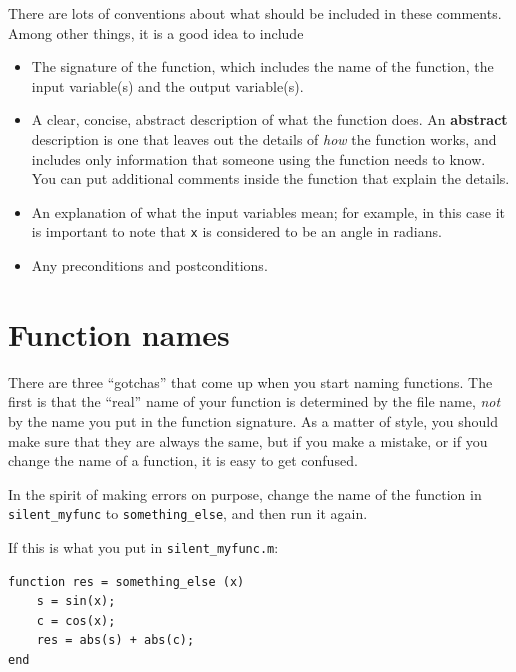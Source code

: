\documentclass[
]{book}
\begin{document}
There are lots of conventions about what should be included
in these comments.  Among other things, it is a good idea to
include

\begin{itemize}

\item The signature of the function, which includes the name
of the function, the input variable(s) and the output variable(s).

\item A clear, concise, abstract description of what the function does.
An {\bf abstract} description is one that leaves out the
details of {\em how} the function works, and includes only information
that someone using the function needs to know.  You can put additional
comments inside the function that explain the details.

\item An explanation of what the input variables mean; for example,
in this case it is important to note that {\tt x} is considered
to be an angle in radians.

\item Any preconditions and postconditions.

\end{itemize}



\section{Function names}

There are three ``gotchas'' that come up when you start naming
functions.  The first is that the ``real'' name of your function
is determined by the file name, {\em not} by the name
you put in the function signature.  As a matter of style, you
should make sure that they are always the same, but if you
make a mistake, or if you change the name of a function, it is
easy to get confused.

In the spirit of making errors on purpose, change the name of
the function in {\tt silent\_myfunc} to {\tt something\_else}, and
then run it again.

If this is what you put in {\tt silent\_myfunc.m}:

\begin{verbatim}
function res = something_else (x)
    s = sin(x);
    c = cos(x);
    res = abs(s) + abs(c);
end
\end{verbatim}
\end{document}
